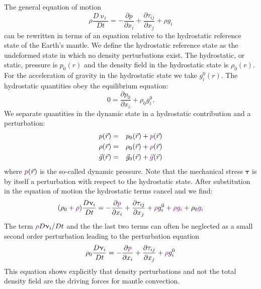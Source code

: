 The general equation of motion 
\begin{equation}
\rho \frac{D\upnu_i}{Dt} = -\frac{\partial p}{\partial x_i} + 
\frac{\partial \tau_{ij}}{\partial x_j} + \rho g_i
\end{equation}
can be rewritten in terms
of an equation relative to the hydrostatic reference state of the Earth's mantle. We define
the hydrostatic reference state as the undeformed state in which no density perturbations
exist. The hydrostatic, or static, pressure is $p_0(r)$ and the density field in the hydrostatic
state is $\rho_0(r)$. For the acceleration of gravity in the hydrostatic state we take $g_i^0(r)$. 
The hydrostatic quantities obey the equilibrium equation: 
\[
0 = \frac{\partial p_0}{\partial x_i} + \rho_0 g_i^0.
\]
We separate quantities in the dynamic state in a hydrostatic contribution and a
perturbation:
\begin{eqnarray}
p(\vec{r}) &=& p_0(\vec{r}) + {\color{violet} p}(\vec{r}) \nonumber\\
\rho(\vec{r}) &=& \rho_0(\vec{r}) + {\color{violet}\rho}(\vec{r}) \nonumber\\
\vec{g}(\vec{r}) &=& \vec{g}_0(\vec{r}) + {\color{violet}\vec{g}}(\vec{r}) \nonumber
\end{eqnarray}
where ${\color{violet} p}(\vec{r})$ is the so-called dynamic pressure.
Note that the mechanical stress ${\bm \tau}$ is by
itself a perturbation with respect to the hydrostatic state. After substitution in the equation
of motion the hydrostatic terms cancel and we find:
\begin{equation}
(\rho_0 + {\color{violet}\rho})  \frac{D\upnu_i}{Dt}
= -\frac{\partial {\color{violet} p}}{\partial x_i} + \frac{\partial \tau_{ij}}{\partial x_j}
+ {\color{violet} \rho} g_i^0 +  {\color{violet} \rho} {\color{violet} g_i}
+ \rho_0  {\color{violet} g_i}
\label{eq:md34a}
\end{equation}
The term $ {\color{violet}\rho} D\upnu_i/Dt$ and the the last two terms can often be 
neglected as a small second order
perturbation leading to the perturbation equation
\begin{equation}
\rho_0   \frac{D\upnu_i}{Dt}
= -\frac{\partial {\color{violet} p}}{\partial x_i} + \frac{\partial \tau_{ij}}{\partial x_j}
+ {\color{violet} \rho} g_i^0 
\label{eq:md34b}
\end{equation}
This equation shows explicitly that density perturbations and not the total density field
are the driving forces for mantle convection.


